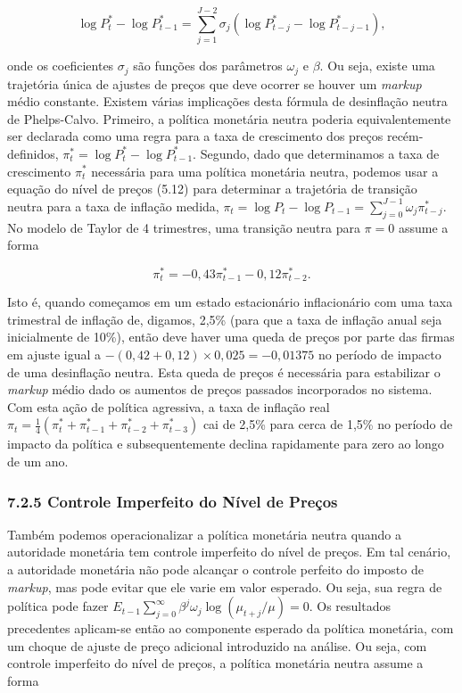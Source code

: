 \documentclass[12pt]{article}
\begin{document}
\begin{equation}
\log P_t^* - \log P_{t-1}^* = \sum_{j=1}^{J-2} \sigma_j (\log P_{t-j}^* - \log P_{t-j-1}^*), \tag{7.2}
\end{equation}

onde os coeficientes $\sigma_j$ são funções dos parâmetros $\omega_j$ e $\beta$. Ou seja, existe uma trajetória única de ajustes de preços que deve ocorrer se houver um \textit{markup} médio constante. Existem várias implicações desta fórmula de desinflação neutra de Phelps-Calvo. Primeiro, a política monetária neutra poderia equivalentemente ser declarada como uma regra para a taxa de crescimento dos preços recém-definidos, $\pi_t^* = \log P_t^* - \log P_{t-1}^*$. Segundo, dado que determinamos a taxa de crescimento $\pi_t^*$ necessária para uma política monetária neutra, podemos usar a equação do nível de preços (5.12) para determinar a trajetória de transição neutra para a taxa de inflação medida, $\pi_t = \log P_t - \log P_{t-1} = \sum_{j=0}^{J-1} \omega_j \pi_{t-j}^*$. No modelo de Taylor de 4 trimestres, uma transição neutra para $\pi = 0$ assume a forma

\begin{equation}
\pi_t^* = -0,43 \pi_{t-1}^* - 0,12 \pi_{t-2}^*. \tag{7.3}
\end{equation}

Isto é, quando começamos em um estado estacionário inflacionário com uma taxa trimestral de inflação de, digamos, 2,5\% (para que a taxa de inflação anual seja inicialmente de 10\%), então deve haver uma queda de preços por parte das firmas em ajuste igual a $-(0,42 + 0,12) \times 0,025 = -0,01375$ no período de impacto de uma desinflação neutra. Esta queda de preços é necessária para estabilizar o \textit{markup} médio dado os aumentos de preços passados incorporados no sistema. Com esta ação de política agressiva, a taxa de inflação real $\pi_t = \frac{1}{4} (\pi_t^* + \pi_{t-1}^* + \pi_{t-2}^* + \pi_{t-3}^*)$ cai de 2,5\% para cerca de 1,5\% no período de impacto da política e subsequentemente declina rapidamente para zero ao longo de um ano.

\subsubsection{7.2.5 Controle Imperfeito do Nível de Preços} Também podemos operacionalizar a política monetária neutra quando a autoridade monetária tem controle imperfeito do nível de preços. Em tal cenário, a autoridade monetária não pode alcançar o controle perfeito do imposto de \textit{markup}, mas pode evitar que ele varie em valor esperado. Ou seja, sua regra de política pode fazer $E_{t-1} \sum_{j=0}^{\infty} \beta^j \omega_j \log(\mu_{t+j}/\mu) = 0$. Os resultados precedentes aplicam-se então ao componente esperado da política monetária, com um choque de ajuste de preço adicional introduzido na análise. Ou seja, com controle imperfeito do nível de preços, a política monetária neutra assume a forma
\end{document}
